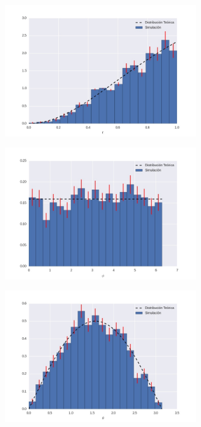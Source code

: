 \documentclass{article}
\begin{document}
\begin{figure}
\centering
\includegraphics[width=0.75\textwidth]{g4ej10_r.jpg}
\caption[]{}
\label{fig:g4ej10_r}
\end{figure}

\begin{figure}
\centering
\includegraphics[width=0.75\textwidth]{g4ej10_phi.jpg}
\caption[]{}
\label{fig:g4ej10_phi}
\end{figure}

\begin{figure}
\centering
\includegraphics[width=0.75\textwidth]{g4ej10_theta.jpg}
\caption[]{}
\label{fig:g4ej10_theta}
\end{figure}
\end{document}
